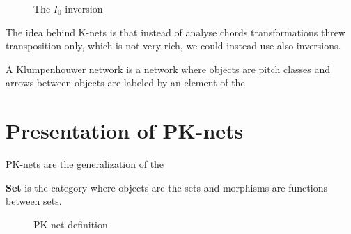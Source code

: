 \documentclass{report}
\begin{document}
\begin{figure}[ht]
    \centering
    \caption{The $I_0$ inversion}
    \label{inversions}
\end{figure}

The idea behind K-nets is that instead of analyse chords transformations threw transposition only, which is not very rich, we could instead use also inversions.

\begin{defn}
 A Klumpenhouwer network is a network where objects are pitch classes and arrows between objects are labeled by an element of the 
\end{defn}


\section{Presentation of PK-nets}

PK-nets\cite{PAAE2016} are the generalization of the


\begin{defn}\textbf{Set} is the category where objects are the sets and morphisms are functions between sets.\end{defn}


\begin{figure}[ht]
    \centering
    \caption{PK-net definition}
\end{figure}
\end{document}
